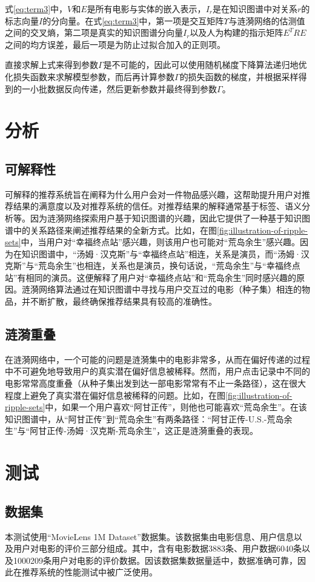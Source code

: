 \documentclass{bjfuthesis}
\begin{document}
式\eqref{eq:term3}中，$V$和$E$是所有电影与实体的嵌入表示，$I_r$是在知识图谱中对关系$r$的标志向量$I$的分向量。在式\eqref{eq:term3}中，第一项是交互矩阵$\Upsilon$与涟漪网络的估测值之间的交叉熵，第二项是真实的知识图谱分向量$I_r$以及人为构建的指示矩阵$E^{T}RE$之间的均方误差，最后一项是为防止过拟合加入的正则项。

直接求解上式来得到参数$\Gamma$是不可能的，因此可以使用随机梯度下降算法递归地优化损失函数来求解模型参数，而后再计算参数$\Gamma$的损失函数的梯度，并根据采样得到的一小批数据反向传递，然后更新参数并最终得到参数$\Gamma$。
\section{分析}
\subsection{可解释性}
可解释的推荐系统旨在阐释为什么用户会对一件物品感兴趣，这帮助提升用户对推荐结果的满意度以及对推荐系统的信任。对推荐结果的解释通常基于标签、语义分析等。因为涟漪网络探索用户基于知识图谱的兴趣，因此它提供了一种基于知识图谱中的关系路径来阐述推荐结果的全新方式。比如，在图\ref{fig:illustration-of-ripple-sets}中，当用户对“幸福终点站”感兴趣，则该用户也可能对“荒岛余生”感兴趣。因为在知识图谱中，“汤姆·汉克斯”与“幸福终点站”相连，关系是演员，而“汤姆·汉克斯”与“荒岛余生”也相连，关系也是演员，换句话说，“荒岛余生”与“幸福终点站”有相同的演员。这便解释了用户对“幸福终点站”和“荒岛余生”同时感兴趣的原因。涟漪网络算法通过在知识图谱中寻找与用户交互过的电影（种子集）相连的物品，并不断扩散，最终确保推荐结果具有较高的准确性。
\subsection{涟漪重叠}
在涟漪网络中，一个可能的问题是涟漪集中的电影非常多，从而在偏好传递的过程中不可避免地导致用户的真实潜在偏好信息被稀释。然而，用户点击记录中不同的电影常常高度重叠（从种子集出发到达一部电影常常有不止一条路径），这在很大程度上避免了真实潜在偏好信息被稀释的问题。比如，在图\ref{fig:illustration-of-ripple-sets}中，如果一个用户喜欢“阿甘正传”，则他也可能喜欢“荒岛余生”。在该知识图谱中，从“阿甘正传”到“荒岛余生”有两条路径：“阿甘正传-U.S.-荒岛余生”与“阿甘正传-汤姆·汉克斯-荒岛余生”，这正是涟漪重叠的表现。
\section{测试}
\subsection{数据集}
本测试使用“MovieLens 1M Dataset”数据集。该数据集由电影信息、用户信息以及用户对电影的评价三部分组成。其中，含有电影数据3883条、用户数据6040条以及1000209条用户对电影的评价数据。因该数据集数据量适中，数据准确可靠，因此在推荐系统的性能测试中被广泛使用。
\end{document}

